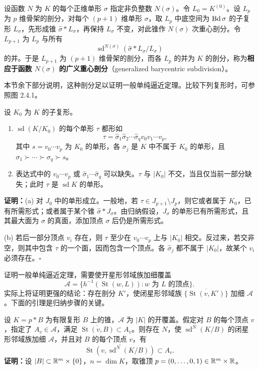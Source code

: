 设函数 $N$ 为 $K$ 的每个正维单形 $\sigma$ 指定非负整数 $N(\sigma)$。令 $L_0=K^{(0)}$。设 $L_p$ 为 $p$ 维骨架的剖分，对每个 $(p+1)$ 维单形 $\sigma$，取 $L_p$ 中底空间为 $\operatorname{Bd}\sigma$ 的子复形 $L_\sigma$，先形成锥 $\widehat\sigma*L_\sigma$，再保持 $L_\sigma$ 不变，对此锥作 $N(\sigma)$ 次重心剖分。令 $L_{p+1}$ 为 $L_p$ 与所有
\[
\operatorname{sd}^{N(\sigma)}(\widehat\sigma*L_\sigma/L_\sigma)
\]
的并。于是 $L_{p+1}$ 为 $(p+1)$ 维骨架的剖分，而各 $L_p$ 的并为 $K$ 的剖分，称为\textbf{相应于函数 $N(\sigma)$ 的广义重心剖分}（generalized barycentric subdivision）。

本节余下部分说明，这种剖分足以证明一般单纯逼近定理。比较下列复形时，可参照图 2.4.1。

设 $K_0$ 为 $K$ 的子复形。
\begin{enumerate}[label=(\alph*)]
\item $\operatorname{sd}(K/K_0)$ 的每个单形 $\tau$ 都形如
\[
\tau=\widehat\sigma_1\widehat\sigma_2\cdots\widehat\sigma_q v_0v_1\cdots v_p,
\]
其中 $s=v_0\cdots v_p$ 为 $K_0$ 的单形，各 $\sigma_j$ 是 $K$ 中不属于 $K_0$ 的单形，且 $\sigma_1\succ\cdots\succ\sigma_q\succ s$。
\item 表达式中的 $v_0\cdots v_p$ 或 $\widehat\sigma_1\cdots\widehat\sigma_q$ 可以缺失。$\tau$ 与 $|K_0|$ 不交，当且仅当前一部分缺失；此时 $\tau$ 是 $\operatorname{sd}K$ 的单形。
\end{enumerate}
\noindent\textbf{证明：}(a) 对 $J_0$ 中的单形成立。一般地，若 $\tau\in J_{p+1}\setminus J_p$，则它或者属于 $K_0$，已有所需形式；或者属于某个锥 $\widehat\sigma*J_\sigma$。由归纳假设，$J_\sigma$ 的单形已有所需形式，且其最大面为 $\sigma$ 的真面，添加顶点 $\widehat\sigma$ 后仍是所需形式。

(b) 若后一部分顶点 $v_i$ 存在，则 $\tau$ 至少在 $v_0\cdots v_p$ 上与 $|K_0|$ 相交。反过来，若交非空，则其中包含 $\tau$ 的一个面，因而包含一个顶点。各 $\widehat\sigma_j$ 都不属于 $|K_0|$，故某个 $v_i$ 必须存在。\hfill$\square$

证明一般单纯逼近定理，需要使开星形邻域族加细覆盖
\[
\mathcal A=\{h^{-1}(\operatorname{St}(w,L)):w\text{ 为 }L\text{ 的顶点}\}.
\]
实际上将证明更强的结论：存在剖分 $K'$，使闭星形邻域族 $\{\overline{\operatorname{St}(v,K')}\}$ 加细 $\mathcal A$。下面的引理是归纳步骤的关键。

设 $K=p*B$ 为有限复形 $B$ 上的锥，$\mathcal A$ 为 $|K|$ 的开覆盖。假定对 $B$ 的每个顶点 $v$，指定了 $A_v\in\mathcal A$，满足 $\overline{\operatorname{St}(v,B)}\subset A_v$。则存在 $N$，使 $\operatorname{sd}^N(K/B)$ 的闭星形邻域族加细 $\mathcal A$，并且对 $B$ 的每个顶点 $v$，有
\[
\overline{\operatorname{St}(v,\operatorname{sd}^N(K/B))}\subset A_v.
\]
\noindent\textbf{证明：}设 $|B|\subset\mathbb{R}^m\times\{0\}$，$n=\dim K$，取锥顶 $p=(0,\ldots,0,1)\in\mathbb{R}^m\times\mathbb{R}$。

